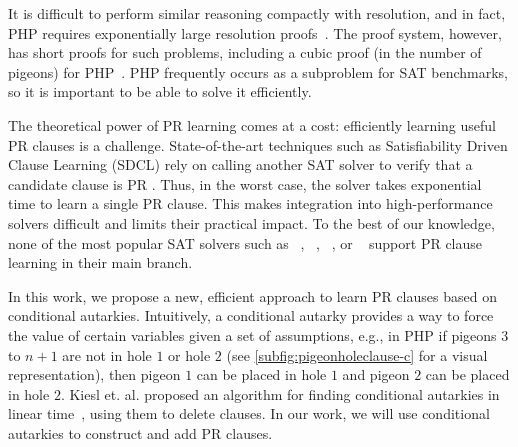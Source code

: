 It is difficult to perform similar reasoning compactly with resolution, and in
fact, PHP requires exponentially large resolution proofs~\cite{hakenpigeonhole}.
The \pr proof system, however, has short proofs for such problems, including a
cubic proof (in the number of pigeons) for PHP~\cite{prclauses}. PHP frequently
occurs as a subproblem for SAT benchmarks, so it is important to be able to
solve it efficiently.

The theoretical power of PR learning comes at a cost: efficiently learning
useful PR clauses is a challenge. State-of-the-art techniques such as
Satisfiability Driven Clause Learning (SDCL) rely on calling another SAT solver
to verify that a candidate clause is PR \cite{sadical}. 
Thus, in the worst case, the solver takes exponential time to learn a single PR
clause. This makes integration into high-performance solvers difficult and
limits their practical impact. To the best of our knowledge, none of the most popular SAT solvers
such as \cadical~\cite{cadical}, \kissat~\cite{kissat},
\cryptoMiniSAT~\cite{cryptominisat}, or \lingeling~\cite{lingeling} support
PR clause learning in their main branch.

In this work, we propose a new, efficient approach to learn PR clauses
based on conditional autarkies. Intuitively, a conditional autarky provides a
way to force the value of certain variables given a set of assumptions, e.g., in
PHP if pigeons $3 $ to $ n+1$ are not in hole $1$ or hole $2$ (see \autoref{subfig:pigeonholeclause-c}
for a visual representation), then pigeon $1$
can be placed in hole $1$ and pigeon $2$ can be placed in hole $2$. Kiesl et.
al. proposed an algorithm for finding conditional autarkies in linear
time~\cite{conditionalautarkies}, using them to delete clauses. In our work, we
will use conditional autarkies to construct and add PR clauses. 
%

